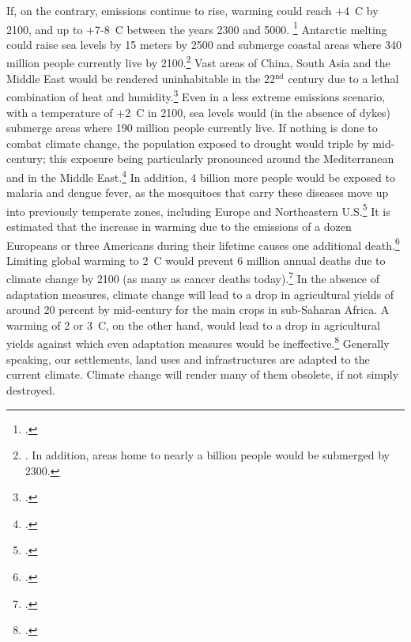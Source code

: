 \documentclass[a5paper,english,openany]{memoir}
\begin{document}
If, on the contrary, emissions continue to rise, warming could reach +4~\textdegree{}C by 2100, and up to +7-8~\textdegree{}C between the years 2300 and 5000.%
\footnote{\citet{montenegro_long_2007}.} Antarctic melting could raise sea levels by 15 meters %
by 2500 and submerge coastal areas where 340 million people currently live by 2100.\footnote{\citet{deconto_contribution_2016,kopp_evolving_2017,kulp_new_2019}. In addition, areas home to nearly a billion people would be submerged by 2300.} Vast areas of China, South Asia and the Middle East would be rendered uninhabitable in the 22$^\text{nd}$ %
century due to a lethal combination of heat and humidity.\footnote{\citet{pal_future_2016,im_deadly_2017,kang_north_2018}.} Even in a less extreme emissions scenario, with a temperature of +2~\textdegree{}C in 2100, sea levels would (in the absence of dykes) submerge areas where 190 million people currently live. %
If nothing is done to combat climate change, the population exposed to drought would triple by mid-century; %
this exposure being particularly pronounced around the Mediterranean and in the Middle East.\footnote{\citet{elliott_constraints_2014,marzi_assessing_2021}.} In addition, 4 billion more people would be exposed to malaria and dengue fever, as the mosquitoes that carry these diseases move up into previously temperate zones, %
including Europe and Northeastern U.S.\footnote{\cite{colon-gonzalez_projecting_2021}.} %
It is estimated that the increase in warming due to the emissions of a dozen Europeans or three Americans %
during their lifetime causes one additional death.\footnote{\citet{bressler_mortality_2021}.} Limiting global warming to 2~\textdegree{}C would prevent 6 million annual deaths due to climate change by 2100 (as many as cancer deaths today).\footnote{\citet{carleton_valuing_2022}.} In the absence of adaptation measures, climate change will lead to a drop in agricultural yields of around 20 percent by mid-century for the main crops in sub-Saharan Africa. A warming of 2 or 3~\textdegree{}C, on the other hand, would lead to a drop in agricultural yields against which even adaptation measures would be ineffective.\footnote{\citet{moore_new_2017,schlenker_robust_2010}.} Generally speaking, our settlements, land uses and infrastructures are adapted to the current climate. Climate change will render many of them obsolete, if not simply destroyed. 
\end{document}
